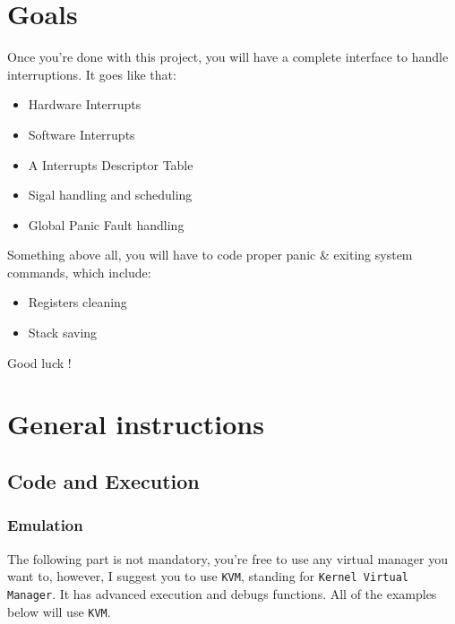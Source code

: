 \documentclass{42-en}
\begin{document}
\newpage
\chapter{Goals}

	Once you're done with this project, you will have a complete interface to
	handle interruptions. It goes like that:

	\begin{itemize}\itemsep1pt
		\item 	Hardware Interrupts
		\item 	Software Interrupts
		\item	A Interrupts Descriptor Table
		\item	Sigal handling and scheduling
		\item	Global Panic Fault handling
	\end{itemize}
	Something above all, you will have to code proper panic \& exiting
    system commands, which include:
	\begin{itemize}\itemsep1pt
		\item	Registers cleaning
		\item	Stack saving
	\end{itemize}
	Good luck ! 

\newpage
\chapter{General instructions}
	\section{Code and Execution}
		\subsection{Emulation}
		The following part is not mandatory, you're free to use any
        virtual manager you want to, however, I suggest you to use
        \texttt{KVM}, standing for \texttt{Kernel Virtual Manager}. It
        has advanced execution and debugs functions.  All of the
        examples below will use \texttt{KVM}.
\end{document}
